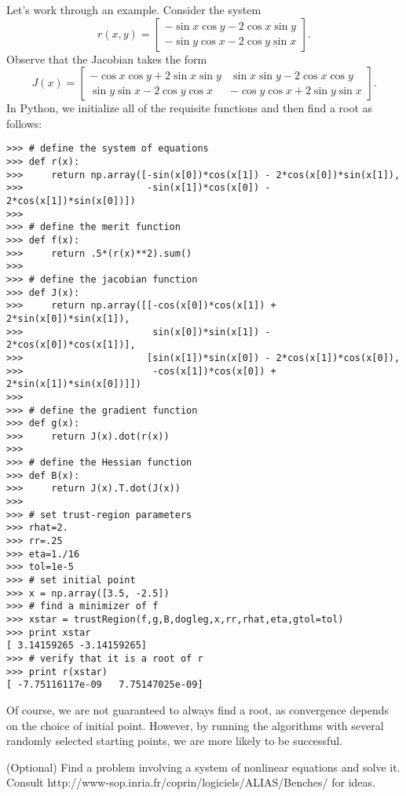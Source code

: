 Let's work through an example. Consider the system
\[
r(x,y) = \begin{bmatrix}
-\sin x\cos y - 2\cos x\sin y\\
-\sin y\cos x - 2\cos y\sin x
\end{bmatrix}.
\]
Observe that the Jacobian takes the form
\[
J(x) = \begin{bmatrix}
-\cos x\cos y + 2\sin x\sin y & \sin x\sin y - 2\cos x\cos y\\
\sin y\sin x - 2\cos y\cos x & -\cos y\cos x + 2\sin y \sin x
\end{bmatrix}.
\]
In Python, we initialize all of the requisite functions and then find a root as follows:
\begin{lstlisting}
>>> # define the system of equations
>>> def r(x):
>>>     return np.array([-sin(x[0])*cos(x[1]) - 2*cos(x[0])*sin(x[1]),
>>>                      -sin(x[1])*cos(x[0]) - 2*cos(x[1])*sin(x[0])])
>>>
>>> # define the merit function
>>> def f(x):
>>>     return .5*(r(x)**2).sum()
>>>
>>> # define the jacobian function
>>> def J(x):
>>>     return np.array([[-cos(x[0])*cos(x[1]) + 2*sin(x[0])*sin(x[1]),
>>>                       sin(x[0])*sin(x[1]) - 2*cos(x[0])*cos(x[1])],
>>>                      [sin(x[1])*sin(x[0]) - 2*cos(x[1])*cos(x[0]),
>>>                       -cos(x[1])*cos(x[0]) + 2*sin(x[1])*sin(x[0])]])
>>>
>>> # define the gradient function
>>> def g(x):
>>>     return J(x).dot(r(x))
>>>
>>> # define the Hessian function
>>> def B(x):
>>>     return J(x).T.dot(J(x))
>>>
>>> # set trust-region parameters
>>> rhat=2.
>>> rr=.25
>>> eta=1./16
>>> tol=1e-5
>>> # set initial point
>>> x = np.array([3.5, -2.5])
>>> # find a minimizer of f
>>> xstar = trustRegion(f,g,B,dogleg,x,rr,rhat,eta,gtol=tol)
>>> print xstar
[ 3.14159265 -3.14159265]
>>> # verify that it is a root of r
>>> print r(xstar)
[ -7.75116117e-09   7.75147025e-09]
\end{lstlisting}

Of course, we are not guaranteed to always find a root, as convergence depends on the choice of initial point.
However, by running the algorithms with several randomly selected starting points, we are more likely to 
be successful.

\begin{problem}
(Optional) Find a problem involving a system of nonlinear equations and solve it. Consult http://www-sop.inria.fr/coprin/logiciels/ALIAS/Benches/ 
for ideas.
\end{problem}

